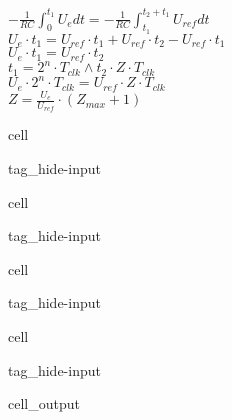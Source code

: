 \documentclass[letterpaper,10pt,english]{jupyterBook}
\begin{document}
\sphinxAtStartPar
\(-\frac{1}{RC} \int_0^{t_1} U_e dt = -\frac{1}{RC} \int_{t_1}^{t_2 + t_1} U_{ref}dt\)\\
\(U_e\cdot t_1 = U_{ref}\cdot t_1 + U_{ref}\cdot t_2 - U_{ref}\cdot t_1\)\\
\(U_e\cdot t_1 = U_{ref} \cdot t_2\)\\
\(t_1 = 2^n\cdot T_{clk} \wedge t_2 \cdot Z\cdot T_{clk}\)\\
\(U_e \cdot 2^n \cdot T_{clk} = U_{ref}\cdot Z \cdot T_{clk}\)\\
\(Z = \frac{U_e}{U_{ref}} \cdot (Z_{max} + 1)\)

\begin{DUlineblock}{0em}
\item[] 
\end{DUlineblock}

\begin{DUlineblock}{0em}
\item[] 
\end{DUlineblock}

\begin{sphinxuseclass}{cell}
\begin{sphinxuseclass}{tag_hide-input}
\end{sphinxuseclass}
\end{sphinxuseclass}
\begin{sphinxuseclass}{cell}
\begin{sphinxuseclass}{tag_hide-input}
\end{sphinxuseclass}
\end{sphinxuseclass}
\begin{sphinxuseclass}{cell}
\begin{sphinxuseclass}{tag_hide-input}
\end{sphinxuseclass}
\end{sphinxuseclass}
\begin{sphinxuseclass}{cell}
\begin{sphinxuseclass}{tag_hide-input}\begin{sphinxVerbatimOutput}

\begin{sphinxuseclass}{cell_output}
\noindent{}

\end{sphinxuseclass}\end{sphinxVerbatimOutput}

\end{sphinxuseclass}
\end{sphinxuseclass}
\begin{DUlineblock}{0em}
\item[] 
\end{DUlineblock}
\end{document}
